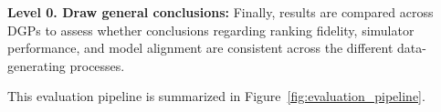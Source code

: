 \medskip

\noindent\textbf{Level 0. Draw general conclusions:} Finally, results are compared across DGPs to assess whether conclusions regarding ranking fidelity, simulator performance, and model alignment are consistent across the different data-generating processes.

\medskip

This evaluation pipeline is summarized in Figure~\ref{fig:evaluation_pipeline}.


